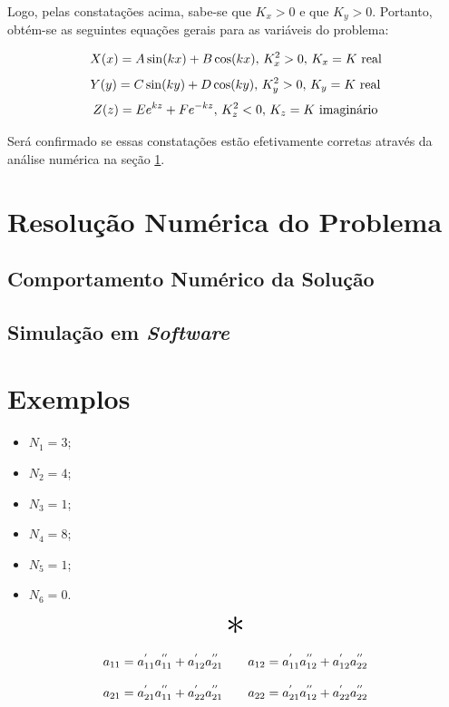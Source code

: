 \documentclass{report}
\let\oldsection\section
\renewcommand\section{\clearpage\oldsection}
\begin{document}
Logo, pelas constatações acima, sabe-se que $ K_x > 0 $ e que $ K_y > 0 $. Portanto, obtém-se as seguintes equações gerais para as
variáveis do problema:

\begin{equation}
    \label{eq:problem_general_solution_x}
    \centering
    X(x) = A\sin(kx) + B\cos(kx),\, K_x^2 > 0,\, K_x = K \text{ real}
\end{equation}
\begin{equation}
    \label{eq:problem_general_solution_y}
    \centering
    Y(y) = C\sin(ky) + D\cos(ky),\, K_y^2 > 0,\, K_y = K \text{ real}
\end{equation}
\begin{equation}
    \label{eq:problem_general_solution_z}
    \centering
    Z(z) = Ee^{kz} + Fe^{-kz},\, K_z^2 < 0,\, K_z = K \text{ imaginário}
\end{equation}

Será confirmado se essas constatações estão efetivamente corretas através da
análise numérica na seção \ref{sec:numerical}.

\section{Resolução Numérica do Problema}
\label{sec:numerical}
\subsection{Comportamento Numérico da Solução}
\subsection{Simulação em \textit{Software}}

\section{Exemplos}

\begin{itemize}
  \item $ N_1 = 3$;
  \item $ N_2 = 4$;
  \item $ N_3 = 1$;
  \item $ N_4 = 8$;
  \item $ N_5 = 1$;
  \item $ N_6 = 0$.
\end{itemize}

\begin{center}
  \[ \scalebox{3}{$ * $} \]
\end{center}

\begin{equation}
  \label{eq:quad_cascade}
  \centering
  \begin{matrix}
    a_{11} = a^{'}_{11}a^{''}_{11} + a^{'}_{12}a^{''}_{21} & \hspace{10pt} a_{12} = a^{'}_{11}a^{''}_{12} + a^{'}_{12}a^{''}_{22} \\\\
    a_{21} = a^{'}_{21}a^{''}_{11} + a^{'}_{22}a^{''}_{21} & \hspace{10pt} a_{22} = a^{'}_{21}a^{''}_{12} + a^{'}_{22}a^{''}_{22}
  \end{matrix}
\end{equation}
\end{document}

